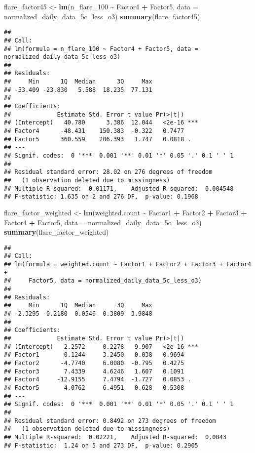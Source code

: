 \documentclass[
]{article}
\newenvironment{Shaded}{\begin{snugshade}}{\end{snugshade}}
\newcommand{\AttributeTok}[1]{\textcolor[rgb]{0.13,0.29,0.53}{#1}}
\newcommand{\FunctionTok}[1]{\textcolor[rgb]{0.13,0.29,0.53}{\textbf{#1}}}
\newcommand{\NormalTok}[1]{#1}
\newcommand{\OtherTok}[1]{\textcolor[rgb]{0.56,0.35,0.01}{#1}}
\newcommand{\SpecialCharTok}[1]{\textcolor[rgb]{0.81,0.36,0.00}{\textbf{#1}}}
\begin{document}
\begin{Shaded}
\begin{Highlighting}[]
\NormalTok{flare\_factor45 }\OtherTok{\textless{}{-}} \FunctionTok{lm}\NormalTok{(n\_flare\_100 }\SpecialCharTok{\textasciitilde{}}\NormalTok{ Factor4 }\SpecialCharTok{+}\NormalTok{ Factor5, }\AttributeTok{data =}\NormalTok{ normalized\_daily\_data\_5c\_less\_o3)}
\FunctionTok{summary}\NormalTok{(flare\_factor45)}
\end{Highlighting}
\end{Shaded}

\begin{verbatim}
## 
## Call:
## lm(formula = n_flare_100 ~ Factor4 + Factor5, data = normalized_daily_data_5c_less_o3)
## 
## Residuals:
##     Min      1Q  Median      3Q     Max 
## -53.409 -23.830   5.588  18.235  77.131 
## 
## Coefficients:
##             Estimate Std. Error t value Pr(>|t|)    
## (Intercept)   40.780      3.386  12.044   <2e-16 ***
## Factor4      -48.431    150.383  -0.322   0.7477    
## Factor5      360.559    206.393   1.747   0.0818 .  
## ---
## Signif. codes:  0 '***' 0.001 '**' 0.01 '*' 0.05 '.' 0.1 ' ' 1
## 
## Residual standard error: 28.02 on 276 degrees of freedom
##   (1 observation deleted due to missingness)
## Multiple R-squared:  0.01171,    Adjusted R-squared:  0.004548 
## F-statistic: 1.635 on 2 and 276 DF,  p-value: 0.1968
\end{verbatim}

\begin{Shaded}
\begin{Highlighting}[]
\NormalTok{flare\_factor\_weighted }\OtherTok{\textless{}{-}} \FunctionTok{lm}\NormalTok{(weighted.count }\SpecialCharTok{\textasciitilde{}}\NormalTok{ Factor1 }\SpecialCharTok{+}\NormalTok{ Factor2 }\SpecialCharTok{+}\NormalTok{ Factor3 }\SpecialCharTok{+}\NormalTok{ Factor4 }\SpecialCharTok{+}\NormalTok{ Factor5, }
                            \AttributeTok{data =}\NormalTok{ normalized\_daily\_data\_5c\_less\_o3)}
\FunctionTok{summary}\NormalTok{(flare\_factor\_weighted)}
\end{Highlighting}
\end{Shaded}

\begin{verbatim}
## 
## Call:
## lm(formula = weighted.count ~ Factor1 + Factor2 + Factor3 + Factor4 + 
##     Factor5, data = normalized_daily_data_5c_less_o3)
## 
## Residuals:
##     Min      1Q  Median      3Q     Max 
## -2.3295 -0.2180  0.0546  0.3809  3.9848 
## 
## Coefficients:
##             Estimate Std. Error t value Pr(>|t|)    
## (Intercept)   2.2572     0.2278   9.907   <2e-16 ***
## Factor1       0.1244     3.2450   0.038   0.9694    
## Factor2      -4.7740     6.0080  -0.795   0.4275    
## Factor3       7.4339     4.6246   1.607   0.1091    
## Factor4     -12.9155     7.4794  -1.727   0.0853 .  
## Factor5       4.0762     6.4951   0.628   0.5308    
## ---
## Signif. codes:  0 '***' 0.001 '**' 0.01 '*' 0.05 '.' 0.1 ' ' 1
## 
## Residual standard error: 0.8492 on 273 degrees of freedom
##   (1 observation deleted due to missingness)
## Multiple R-squared:  0.02221,    Adjusted R-squared:  0.0043 
## F-statistic:  1.24 on 5 and 273 DF,  p-value: 0.2905
\end{verbatim}
\end{document}
